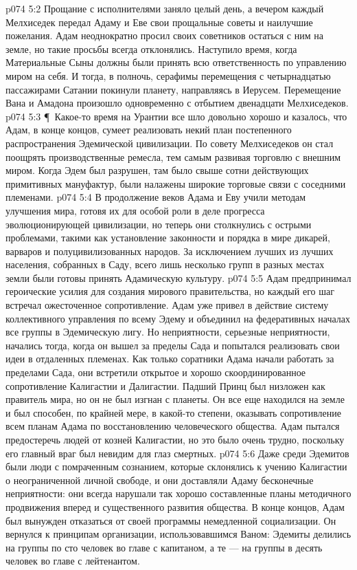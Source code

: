 \vs p074 5:2 Прощание с исполнителями заняло целый день, а вечером каждый Мелхиседек передал Адаму и Еве свои прощальные советы и наилучшие пожелания. Адам неоднократно просил своих советников остаться с ним на земле, но такие просьбы всегда отклонялись. Наступило время, когда Материальные Сыны должны были принять всю ответственность по управлению миром на себя. И тогда, в полночь, серафимы перемещения с четырнадцатью пассажирами Сатании покинули планету, направляясь в Иерусем. Перемещение Вана и Амадона произошло одновременно с отбытием двенадцати Мелхиседеков.
\vs p074 5:3 \P\ Какое\hyp{}то время на Урантии все шло довольно хорошо и казалось, что Адам, в конце концов, сумеет реализовать некий план постепенного распространения Эдемической цивилизации. По совету Мелхиседеков он стал поощрять производственные ремесла, тем самым развивая торговлю с внешним миром. Когда Эдем был разрушен, там было свыше сотни действующих примитивных мануфактур, были налажены широкие торговые связи с соседними племенами.
\vs p074 5:4 В продолжение веков Адама и Еву учили методам улучшения мира, готовя их для особой роли в деле прогресса эволюционирующей цивилизации, но теперь они столкнулись с острыми проблемами, такими как установление законности и порядка в мире дикарей, варваров и полуцивилизованных народов. За исключением лучших из лучших населения, собранных в Саду, всего лишь несколько групп в разных местах земли были готовы принять Адамическую культуру.
\vs p074 5:5 Адам предпринимал героические усилия для создания мирового правительства, но каждый его шаг встречал ожесточенное сопротивление. Адам уже привел в действие систему коллективного управления по всему Эдему и объединил на федеративных началах все группы в Эдемическую лигу. Но неприятности, серьезные неприятности, начались тогда, когда он вышел за пределы Сада и попытался реализовать свои идеи в отдаленных племенах. Как только соратники Адама начали работать за пределами Сада, они встретили открытое и хорошо скоординированное сопротивление Калигастии и Далигастии. Падший Принц был низложен как правитель мира, но он не был изгнан с планеты. Он все еще находился на земле и был способен, по крайней мере, в какой\hyp{}то степени, оказывать сопротивление всем планам Адама по восстановлению человеческого общества. Адам пытался предостеречь людей от козней Калигастии, но это было очень трудно, поскольку его главный враг был невидим для глаз смертных.
\vs p074 5:6 Даже среди Эдемитов были люди с помраченным сознанием, которые склонялись к учению Калигастии о неограниченной личной свободе, и они доставляли Адаму бесконечные неприятности: они всегда нарушали так хорошо составленные планы методичного продвижения вперед и существенного развития общества. В конце концов, Адам был вынужден отказаться от своей программы немедленной социализации. Он вернулся к принципам организации, использовавшимся Ваном: Эдемиты делились на группы по сто человек во главе с капитаном, а те --- на группы в десять человек во главе с лейтенантом.
